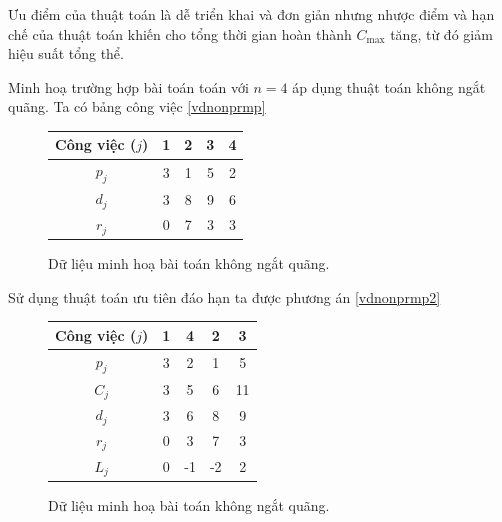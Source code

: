Ưu điểm của thuật toán là dễ triển khai và đơn giản nhưng nhược điểm và hạn chế của thuật toán khiến cho tổng thời gian hoàn thành $C_{\max}$ tăng, từ đó giảm hiệu suất tổng thể.
\begin{vd} \label{kongatquang}
Minh hoạ trường hợp bài toán toán với $n=4$ áp dụng thuật toán không ngắt quãng.
Ta có bảng công việc \eqref{vdnonprmp}

\begin{figure}[h!]
	\centering
		\begin{tabular}{|c | c c c c |} 
		\hline
		Công việc ($j$) & 1 & 2 & 3 & 4 \\
		\hline\hline
		$p_j$ & 3 & 1 & 5 & 2 \\
		\hline
		$d_j$ & 3 & 8 & 9 & 6 \\
		\hline
		$r_j$ & 0 & 7 & 3 & 3 \\
		\hline
		\end{tabular}
\caption{\label{vdnonprmp} Dữ liệu minh hoạ bài toán không ngắt quãng.}
\end{figure}

Sử dụng thuật toán ưu tiên đáo hạn ta được phương án \eqref{vdnonprmp2}
\begin{figure}[h!]
	\centering
		\begin{tabular}{|c | c c c c |} 
		\hline
		Công việc ($j$) & 1 & 4 & 2 & 3 \\
		\hline\hline
		$p_j$ & 3 & 2 & 1 & 5 \\
		\hline
		$C_j$ & 3 & 5 & 6 & 11 \\
		\hline
		$d_j$ & 3 & 6 & 8 & 9 \\
		\hline
		$r_j$ & 0 & 3 & 7 & 3 \\
		\hline
		$L_j$ & 0 & -1 & -2 & 2 \\
		\hline
		\end{tabular}
\caption{\label{vdnonprmp2} Dữ liệu minh hoạ bài toán không ngắt quãng.}
\end{figure}


\end{vd}
